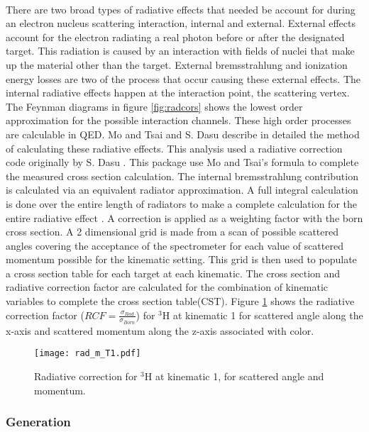 \paragraph{}There are two broad types of radiative effects that needed be account for during an electron nucleus scattering interaction, internal and external. External effects account for the electron radiating a real photon before or after the designated target. This radiation is caused by an interaction with fields of nuclei that make up the material other than the target. External bremsstrahlung and ionization energy losses are two of the process that occur causing these external effects. The internal radiative effects happen at the interaction point, the scattering vertex. The Feynman diagrams in figure \ref{fig:radcors} shows the lowest order approximation for the possible interaction channels. These high order processes are calculable in QED. Mo and Tsai \cite{radcors2} and S. Dasu \cite{radcors} describe in detailed the method of calculating these radiative effects. This analysis used a radiative correction code originally by S. Dasu \cite{radcors}. This package use Mo and Tsai's formula to complete the measured cross section calculation.  The internal bremsstrahlung contribution is calculated via an equivalent radiator approximation. A full integral calculation is done over the entire length of radiators to make a complete calculation for the entire radiative effect  \cite{Ajth,radcors,radcors2,seelyth}. A correction is applied as a weighting factor with the born cross section. A 2 dimensional grid is made from a scan of possible scattered angles covering the acceptance of the spectrometer for each value of scattered momentum possible for the kinematic setting. This grid is then used to populate a cross section table for each target at each kinematic. The cross section and radiative correction factor are calculated for the combination of kinematic variables to complete the cross section table(CST). Figure \ref{RCF} shows the radiative correction factor ($RCF=\frac{\sigma_{Rad}}{\sigma_{Born}}$) for $^3$H at kinematic 1 for scattered angle along the x-axis and scattered momentum along the z-axis associated with color.  
\begin{figure}
	\texttt{[image: rad\_m\_T1.pdf]}
		\caption{Radiative correction for $^3$H at kinematic 1, for scattered angle and momentum.\label{RCF}}
\end{figure}

\subsubsection{Generation}
